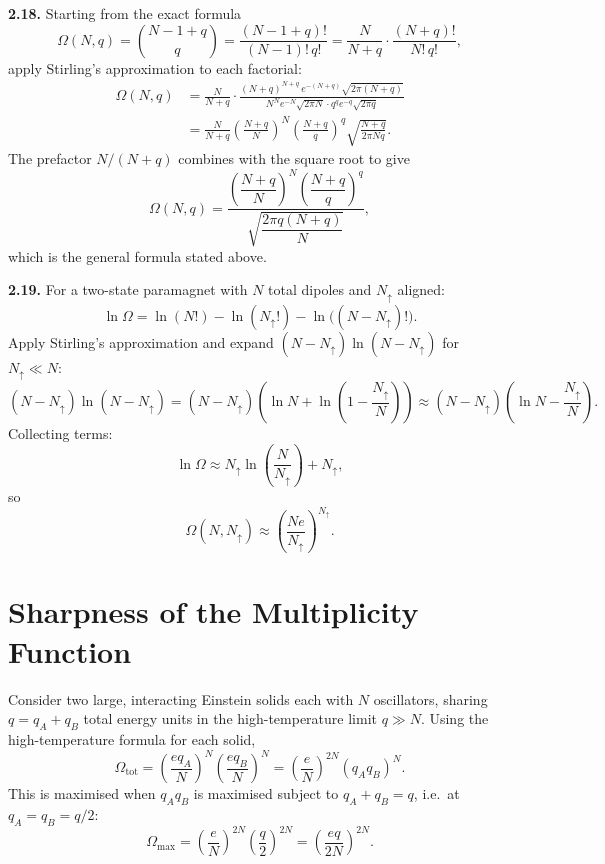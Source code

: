 \textbf{2.18.}
Starting from the exact formula
\[
  \Omega(N,q) = \binom{N-1+q}{q} = \frac{(N-1+q)!}{(N-1)!\,q!}
  = \frac{N}{N+q}\cdot\frac{(N+q)!}{N!\,q!},
\]
apply Stirling's approximation to each factorial:
\begin{align*}
  \Omega(N,q)
  &= \frac{N}{N+q}\cdot
     \frac{(N+q)^{N+q}\,e^{-(N+q)}\sqrt{2\pi(N+q)}}
          {N^N e^{-N}\sqrt{2\pi N}\cdot q^q e^{-q}\sqrt{2\pi q}} \\
  &= \frac{N}{N+q}\left(\frac{N+q}{N}\right)^N\!\left(\frac{N+q}{q}\right)^q
     \sqrt{\frac{N+q}{2\pi Nq}}.
\end{align*}
The prefactor $N/(N+q)$ combines with the square root to give
\[
  \Omega(N,q)
  = \frac{\left(\dfrac{N+q}{N}\right)^N\!\left(\dfrac{N+q}{q}\right)^q}
         {\sqrt{\dfrac{2\pi q(N+q)}{N}}},
\]
which is the general formula stated above.

\textbf{2.19.}
For a two-state paramagnet with $N$ total dipoles and $N_\uparrow$ aligned:
\[
  \ln\Omega
  = \ln(N!) - \ln(N_\uparrow!) - \ln\!\bigl((N-N_\uparrow)!\bigr).
\]
Apply Stirling's approximation and expand $(N-N_\uparrow)\ln(N-N_\uparrow)$ for
$N_\uparrow \ll N$:
\[
  (N-N_\uparrow)\ln(N-N_\uparrow)
  = (N-N_\uparrow)\!\left(\ln N + \ln\!\left(1-\frac{N_\uparrow}{N}\right)\right)
  \approx (N-N_\uparrow)\!\left(\ln N - \frac{N_\uparrow}{N}\right).
\]
Collecting terms:
\[
  \ln\Omega \approx N_\uparrow\ln\!\left(\frac{N}{N_\uparrow}\right) + N_\uparrow,
\]
so
\[
  \Omega(N, N_\uparrow) \approx \left(\frac{Ne}{N_\uparrow}\right)^{N_\uparrow}.
\]

\section{Sharpness of the Multiplicity Function}
\label{sec:sharpness}

Consider two large, interacting Einstein solids each with $N$ oscillators, sharing $q =
q_A + q_B$ total energy units in the high-temperature limit $q \gg N$.  Using the
high-temperature formula for each solid,
\[
  \Omega_{\text{tot}}
  = \left(\frac{eq_A}{N}\right)^N\!\left(\frac{eq_B}{N}\right)^N
  = \left(\frac{e}{N}\right)^{2N}(q_A q_B)^N.
\]
This is maximised when $q_A q_B$ is maximised subject to $q_A + q_B = q$, i.e.\ at
$q_A = q_B = q/2$:
\[
  \Omega_{\max} = \left(\frac{e}{N}\right)^{2N}\!\left(\frac{q}{2}\right)^{2N}
               = \left(\frac{eq}{2N}\right)^{2N}.
\]

